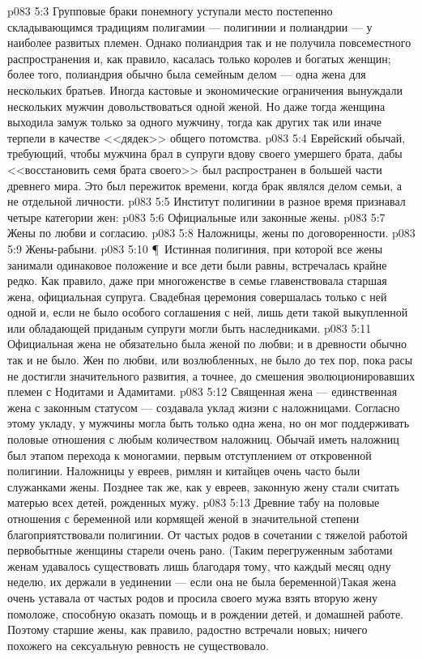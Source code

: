 \vs p083 5:3 Групповые браки понемногу уступали место постепенно складывающимся традициям полигамии --- полигинии и полиандрии --- у наиболее развитых племен. Однако полиандрия так и не получила повсеместного распространения и, как правило, касалась только королев и богатых женщин; более того, полиандрия обычно была семейным делом --- одна жена для нескольких братьев. Иногда кастовые и экономические ограничения вынуждали нескольких мужчин довольствоваться одной женой. Но даже тогда женщина выходила замуж только за одного мужчину, тогда как других так или иначе терпели в качестве <<дядек>> общего потомства.
\vs p083 5:4 Еврейский обычай, требующий, чтобы мужчина брал в супруги вдову своего умершего брата, дабы <<восстановить семя брата своего>> был распространен в большей части древнего мира. Это был пережиток времени, когда брак являлся делом семьи, а не отдельной личности.
\vs p083 5:5 Институт полигинии в разное время признавал четыре категории жен:
\vs p083 5:6 \bibnobreakspace Официальные или законные жены.
\vs p083 5:7 \bibnobreakspace Жены по любви и согласию.
\vs p083 5:8 \bibnobreakspace Наложницы, жены по договоренности.
\vs p083 5:9 \bibnobreakspace Жены\hyp{}рабыни.
\vs p083 5:10 \P\ Истинная полигиния, при которой все жены занимали одинаковое положение и все дети были равны, встречалась крайне редко. Как правило, даже при многоженстве в семье главенствовала старшая жена, официальная супруга. Свадебная церемония совершалась только с ней одной и, если не было особого соглашения с ней, лишь дети такой выкупленной или обладающей приданым супруги могли быть наследниками.
\vs p083 5:11 Официальная жена не обязательно была женой по любви; и в древности обычно так и не было. Жен по любви, или возлюбленных, не было до тех пор, пока расы не достигли значительного развития, а точнее, до смешения эволюционировавших племен с Нодитами и Адамитами.
\vs p083 5:12 Священная жена --- единственная жена с законным статусом --- создавала уклад жизни с наложницами. Согласно этому укладу, у мужчины могла быть только одна жена, но он мог поддерживать половые отношения с любым количеством наложниц. Обычай иметь наложниц был этапом перехода к моногамии, первым отступлением от откровенной полигинии. Наложницы у евреев, римлян и китайцев очень часто были служанками жены. Позднее так же, как у евреев, законную жену стали считать матерью всех детей, рожденных мужу.
\vs p083 5:13 Древние табу на половые отношения с беременной или кормящей женой в значительной степени благоприятствовали полигинии. От частых родов в сочетании с тяжелой работой первобытные женщины старели очень рано. (Таким перегруженным заботами женам удавалось существовать лишь благодаря тому, что каждый месяц одну неделю, их держали в уединении --- если она не была беременной)Такая жена очень уставала от частых родов и просила своего мужа взять вторую жену помоложе, способную оказать помощь и в рождении детей, и домашней работе. Поэтому старшие жены, как правило, радостно встречали новых; ничего похожего на сексуальную ревность не существовало.
